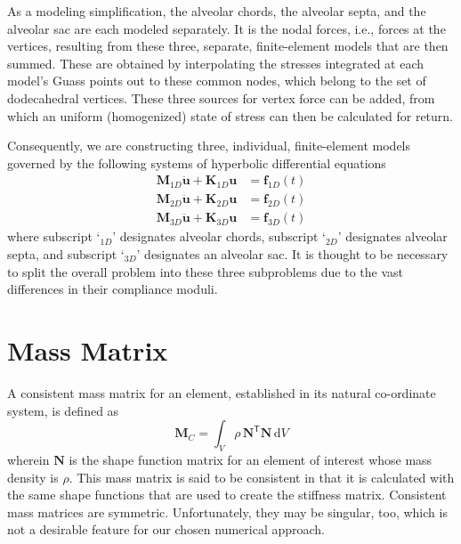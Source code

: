 As a modeling simplification, the alveolar chords, the alveolar septa, and the alveolar sac are each modeled separately.  It is the nodal forces, i.e., forces at the vertices, resulting from these three, separate, finite-element models that are then summed.  These are obtained by interpolating the stresses integrated at each model's Guass points out to these common nodes, which belong to the set of dodecahedral vertices.  These three sources for vertex force can be added, from which an uniform (homo\-genized) state of stress can then be calculated for return.  

Consequently, we are constructing three, individual, finite-element models governed by the following systems of hyperbolic differential equations
\begin{subequations}
	\begin{align}
	\mathbf{M}_{1D} \ddot{\mathbf{u}} + \mathbf{K}_{1D} \mathbf{u} & 
	= \mathbf{f}_{1D}(t) \\
	\mathbf{M}_{2D} \ddot{\mathbf{u}} + \mathbf{K}_{2D} \mathbf{u} & 
	= \mathbf{f}_{2D}(t) \\
	\mathbf{M}_{3D} \ddot{\mathbf{u}} + \mathbf{K}_{3D} \mathbf{u} & 
	= \mathbf{f}_{3D}(t)
	\end{align}
\end{subequations}
where subscript `$\mbox{}_{1D}$' designates alveolar chords, subscript `$\mbox{}_{2D}$' designates alveolar septa, and subscript `$\mbox{}_{3D}$' designates an alveolar sac.  It is thought to be necessary to split the overall problem into these three subproblems due to the vast differences in their compliance moduli.

\section{Mass Matrix}

A consistent mass matrix \cite{Archer65} for an element, established in its natural co-ordinate system, is defined as
\begin{equation}
\mathbf{M}_{C} = \int_{V} \rho \, \mathbf{N}^{\mathsf{T}} \mathbf{N} \,
\mathrm{d} V
\label{consistentMassMatrix}
\end{equation}
wherein $\mathbf{N}$ is the shape function matrix for an element of interest whose mass density is $\rho$.  This mass matrix is said to be consistent in that it is calculated with the same shape functions that are used to create the stiffness matrix.  Consistent mass matrices are symmetric.  Unfortunately, they may be singular, too, which is not a desirable feature for our chosen numerical approach.

